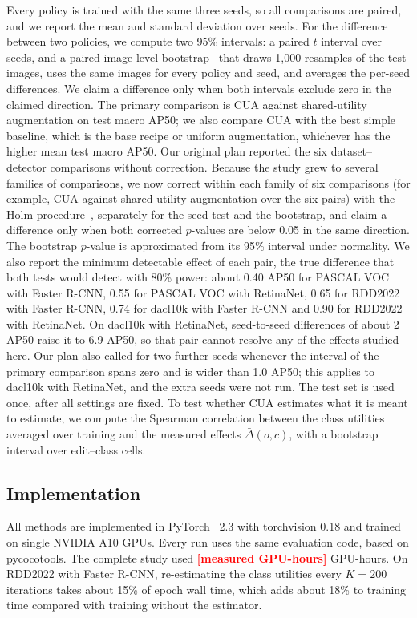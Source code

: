 \documentclass[conference]{IEEEtran}
\newcommand{\todo}[1]{\textcolor{red}{\textbf{[#1]}}}
\begin{document}
Every policy is trained with the same three seeds, so all comparisons are paired, and we report the mean and standard deviation over seeds. For the difference between two policies, we compute two 95\% intervals: a paired $t$ interval over seeds, and a paired image-level bootstrap~\cite{efron1979} that draws 1,000 resamples of the test images, uses the same images for every policy and seed, and averages the per-seed differences. We claim a difference only when both intervals exclude zero in the claimed direction. The primary comparison is CUA against shared-utility augmentation on test macro AP50; we also compare CUA with the best simple baseline, which is the base recipe or uniform augmentation, whichever has the higher mean test macro AP50. Our original plan reported the six dataset--detector comparisons without correction. Because the study grew to several families of comparisons, we now correct within each family of six comparisons (for example, CUA against shared-utility augmentation over the six pairs) with the Holm procedure~\cite{holm1979}, separately for the seed test and the bootstrap, and claim a difference only when both corrected $p$-values are below 0.05 in the same direction. The bootstrap $p$-value is approximated from its 95\% interval under normality. We also report the minimum detectable effect of each pair, the true difference that both tests would detect with 80\% power: about 0.40 AP50 for PASCAL VOC with Faster R-CNN, 0.55 for PASCAL VOC with RetinaNet, 0.65 for RDD2022 with Faster R-CNN, 0.74 for dacl10k with Faster R-CNN and 0.90 for RDD2022 with RetinaNet. On dacl10k with RetinaNet, seed-to-seed differences of about 2 AP50 raise it to 6.9 AP50, so that pair cannot resolve any of the effects studied here. Our plan also called for two further seeds whenever the interval of the primary comparison spans zero and is wider than 1.0 AP50; this applies to dacl10k with RetinaNet, and the extra seeds were not run. The test set is used once, after all settings are fixed. To test whether CUA estimates what it is meant to estimate, we compute the Spearman correlation between the class utilities averaged over training and the measured effects $\bar\Delta(o,c)$, with a bootstrap interval over edit--class cells.

\subsection{Implementation}
\label{sec:setup_impl}

All methods are implemented in PyTorch~\cite{paszke2019pytorch} 2.3 with torchvision 0.18 and trained on single NVIDIA A10 GPUs. Every run uses the same evaluation code, based on pycocotools. The complete study used \todo{measured GPU-hours} GPU-hours. On RDD2022 with Faster R-CNN, re-estimating the class utilities every $K=200$ iterations takes about 15\% of epoch wall time, which adds about 18\% to training time compared with training without the estimator.
\end{document}
